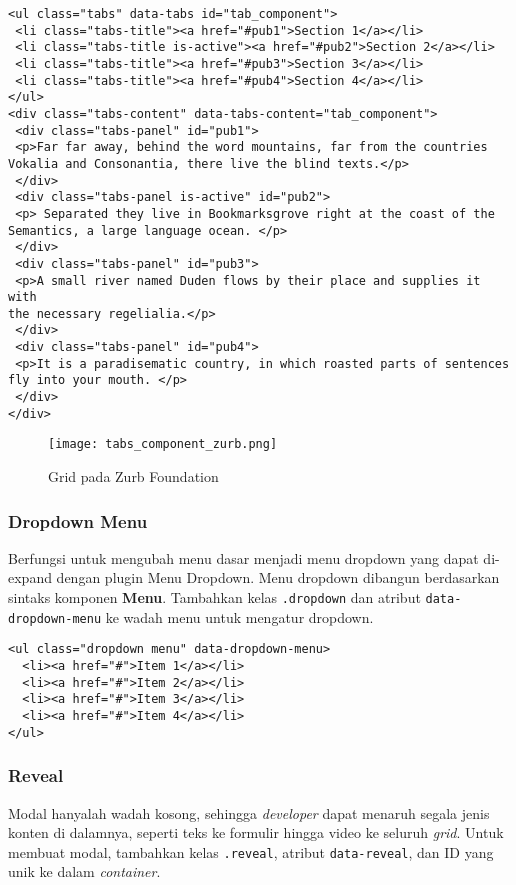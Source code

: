 {\begin{lstlisting}[frame=single] 
<ul class="tabs" data-tabs id="tab_component">
 <li class="tabs-title"><a href="#pub1">Section 1</a></li>
 <li class="tabs-title is-active"><a href="#pub2">Section 2</a></li>
 <li class="tabs-title"><a href="#pub3">Section 3</a></li>
 <li class="tabs-title"><a href="#pub4">Section 4</a></li>
</ul>
<div class="tabs-content" data-tabs-content="tab_component">
 <div class="tabs-panel" id="pub1">
 <p>Far far away, behind the word mountains, far from the countries
Vokalia and Consonantia, there live the blind texts.</p>
 </div>
 <div class="tabs-panel is-active" id="pub2">
 <p> Separated they live in Bookmarksgrove right at the coast of the
Semantics, a large language ocean. </p>
 </div>
 <div class="tabs-panel" id="pub3">
 <p>A small river named Duden flows by their place and supplies it with
the necessary regelialia.</p>
 </div>
 <div class="tabs-panel" id="pub4">
 <p>It is a paradisematic country, in which roasted parts of sentences
fly into your mouth. </p>
 </div>
</div>
\end{lstlisting}

\begin{figure} [H]
	\centering  
	\texttt{[image: tabs\_component\_zurb.png]}  
	\caption{Grid pada Zurb Foundation}
\end{figure}

\subsubsection{Dropdown Menu}
Berfungsi untuk mengubah menu dasar menjadi menu dropdown yang dapat di-expand dengan plugin Menu Dropdown.
Menu dropdown dibangun berdasarkan sintaks komponen \textbf{Menu}. Tambahkan kelas \texttt{.dropdown} dan atribut \texttt{data-dropdown-menu} ke wadah menu untuk mengatur dropdown. 
\begin{lstlisting}[frame=single] 
<ul class="dropdown menu" data-dropdown-menu>
  <li><a href="#">Item 1</a></li>
  <li><a href="#">Item 2</a></li>
  <li><a href="#">Item 3</a></li>
  <li><a href="#">Item 4</a></li>
</ul>
\end{lstlisting}

\subsubsection{Reveal}
Modal hanyalah wadah kosong, sehingga \textit{developer} dapat menaruh segala jenis konten di dalamnya, seperti teks ke formulir hingga video ke seluruh \textit{grid}.
Untuk membuat modal, tambahkan kelas \texttt{.reveal}, atribut \texttt{data-reveal}, dan ID yang unik ke dalam \textit{container}.

}
